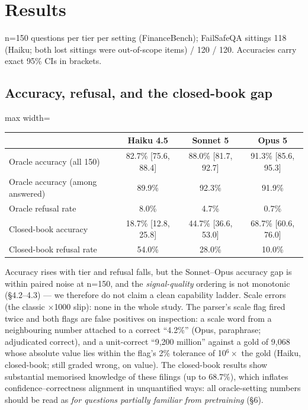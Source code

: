 \documentclass[11pt]{article}
\begin{document}
\section{Results}

n=150 questions per tier per setting (FinanceBench); FailSafeQA sittings 118 (Haiku; both lost sittings were out-of-scope items) / 120 / 120. Accuracies carry exact 95\% CIs in brackets.


\subsection{Accuracy, refusal, and the closed-book gap}

\begin{center}\small
\begin{adjustbox}{max width=\linewidth}
\begin{tabular}{lccc}
\toprule
 & Haiku 4.5 & Sonnet 5 & Opus 5 \\
\midrule
Oracle accuracy (all 150) & 82.7\% [75.6, 88.4] & 88.0\% [81.7, 92.7] & 91.3\% [85.6, 95.3] \\
Oracle accuracy (among answered) & 89.9\% & 92.3\% & 91.9\% \\
Oracle refusal rate & 8.0\% & 4.7\% & 0.7\% \\
Closed-book accuracy & 18.7\% [12.8, 25.8] & 44.7\% [36.6, 53.0] & 68.7\% [60.6, 76.0] \\
Closed-book refusal rate & 54.0\% & 28.0\% & 10.0\% \\
\bottomrule
\end{tabular}
\end{adjustbox}
\end{center}


Accuracy rises with tier and refusal falls, but the Sonnet--Opus accuracy gap is within paired noise at n=150, and the \emph{signal-quality} ordering is not monotonic (\S{}4.2--4.3) --- we therefore do not claim a clean capability ladder. Scale errors (the classic $\times$1000 slip): none in the whole study. The parser's scale flag fired twice and both flags are false positives on inspection: a scale word from a neighbouring number attached to a correct ``4.2\%'' (Opus, paraphrase; adjudicated correct), and a unit-correct ``9,200 million'' against a gold of 9,068 whose absolute value lies within the flag's 2\% tolerance of 10$^{6}\times$ the gold (Haiku, closed-book; still graded wrong, on value). The closed-book results show substantial memorised knowledge of these filings (up to 68.7\%), which inflates confidence--correctness alignment in unquantified ways: all oracle-setting numbers should be read as \emph{for questions partially familiar from pretraining} (\S{}6).
\end{document}
